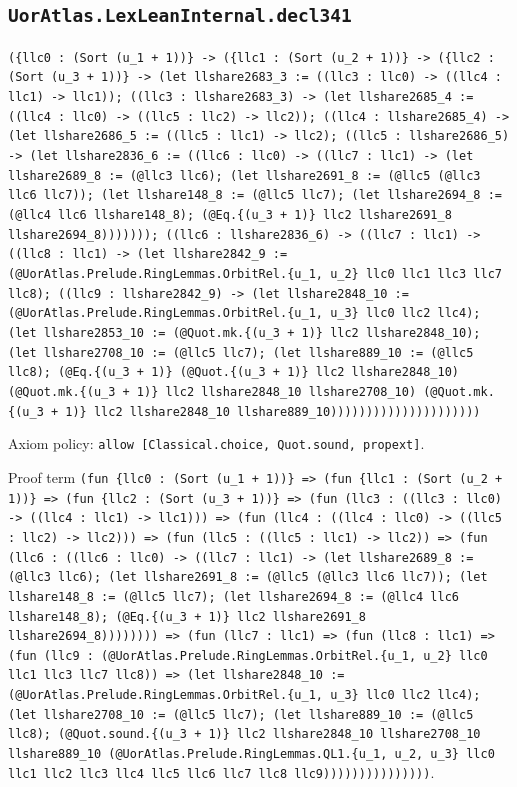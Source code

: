 \documentclass[11pt]{article}
\begin{document}
\subsection*{\texttt{UorAtlas.LexLeanInternal.decl341}}
\noindent\texttt{(\{llc0 : (Sort (u\_1 + 1))\} -> (\{llc1 : (Sort (u\_2 + 1))\} -> (\{llc2 : (Sort (u\_3 + 1))\} -> (let llshare2683\_3 := ((llc3 : llc0) -> ((llc4 : llc1) -> llc1)); ((llc3 : llshare2683\_3) -> (let llshare2685\_4 := ((llc4 : llc0) -> ((llc5 : llc2) -> llc2)); ((llc4 : llshare2685\_4) -> (let llshare2686\_5 := ((llc5 : llc1) -> llc2); ((llc5 : llshare2686\_5) -> (let llshare2836\_6 := ((llc6 : llc0) -> ((llc7 : llc1) -> (let llshare2689\_8 := (@llc3 llc6); (let llshare2691\_8 := (@llc5 (@llc3 llc6 llc7)); (let llshare148\_8 := (@llc5 llc7); (let llshare2694\_8 := (@llc4 llc6 llshare148\_8); (@Eq.\{(u\_3 + 1)\} llc2 llshare2691\_8 llshare2694\_8))))))); ((llc6 : llshare2836\_6) -> ((llc7 : llc1) -> ((llc8 : llc1) -> (let llshare2842\_9 := (@UorAtlas.Prelude.RingLemmas.OrbitRel.\{u\_1, u\_2\} llc0 llc1 llc3 llc7 llc8); ((llc9 : llshare2842\_9) -> (let llshare2848\_10 := (@UorAtlas.Prelude.RingLemmas.OrbitRel.\{u\_1, u\_3\} llc0 llc2 llc4); (let llshare2853\_10 := (@Quot.mk.\{(u\_3 + 1)\} llc2 llshare2848\_10); (let llshare2708\_10 := (@llc5 llc7); (let llshare889\_10 := (@llc5 llc8); (@Eq.\{(u\_3 + 1)\} (@Quot.\{(u\_3 + 1)\} llc2 llshare2848\_10) (@Quot.mk.\{(u\_3 + 1)\} llc2 llshare2848\_10 llshare2708\_10) (@Quot.mk.\{(u\_3 + 1)\} llc2 llshare2848\_10 llshare889\_10)))))))))))))))))))))}\par
\noindent Axiom policy: \texttt{allow [Classical.choice, Quot.sound, propext]}.\par
\noindent Proof term \texttt{(fun \{llc0 : (Sort (u\_1 + 1))\} => (fun \{llc1 : (Sort (u\_2 + 1))\} => (fun \{llc2 : (Sort (u\_3 + 1))\} => (fun (llc3 : ((llc3 : llc0) -> ((llc4 : llc1) -> llc1))) => (fun (llc4 : ((llc4 : llc0) -> ((llc5 : llc2) -> llc2))) => (fun (llc5 : ((llc5 : llc1) -> llc2)) => (fun (llc6 : ((llc6 : llc0) -> ((llc7 : llc1) -> (let llshare2689\_8 := (@llc3 llc6); (let llshare2691\_8 := (@llc5 (@llc3 llc6 llc7)); (let llshare148\_8 := (@llc5 llc7); (let llshare2694\_8 := (@llc4 llc6 llshare148\_8); (@Eq.\{(u\_3 + 1)\} llc2 llshare2691\_8 llshare2694\_8)))))))) => (fun (llc7 : llc1) => (fun (llc8 : llc1) => (fun (llc9 : (@UorAtlas.Prelude.RingLemmas.OrbitRel.\{u\_1, u\_2\} llc0 llc1 llc3 llc7 llc8)) => (let llshare2848\_10 := (@UorAtlas.Prelude.RingLemmas.OrbitRel.\{u\_1, u\_3\} llc0 llc2 llc4); (let llshare2708\_10 := (@llc5 llc7); (let llshare889\_10 := (@llc5 llc8); (@Quot.sound.\{(u\_3 + 1)\} llc2 llshare2848\_10 llshare2708\_10 llshare889\_10 (@UorAtlas.Prelude.RingLemmas.QL1.\{u\_1, u\_2, u\_3\} llc0 llc1 llc2 llc3 llc4 llc5 llc6 llc7 llc8 llc9)))))))))))))))}.\par
\end{document}
